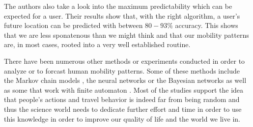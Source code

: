 The authors also take a look into the maximum predictability which can be
expected for a user. Their results show that, with the right algorithm, a user's
future location can be predicted with between $80-93\%$ accuracy. This shows
that we are less sponatenous than we might think and that our mobility patterns
are, in most cases, rooted into a very well established routine.

There have been numerous other methods or experiments conducted in order to
analyze or to forcast human mobility patterns. Some of these methods include the
Markov chain models \cite{Ross09} \cite{Liu96}, the neural networks \cite{Liou03}
or the Bayesian networks \cite{Akoush07} as well as some that work with finite
automaton \cite{Petzold04}. Most of the studies support the idea that people's
actions and travel behavior is indeed far from being random and thus the science
world needs to dedicate further effort and time in order to use this knowledge
in order to improve our quality of life and the world we live in.
